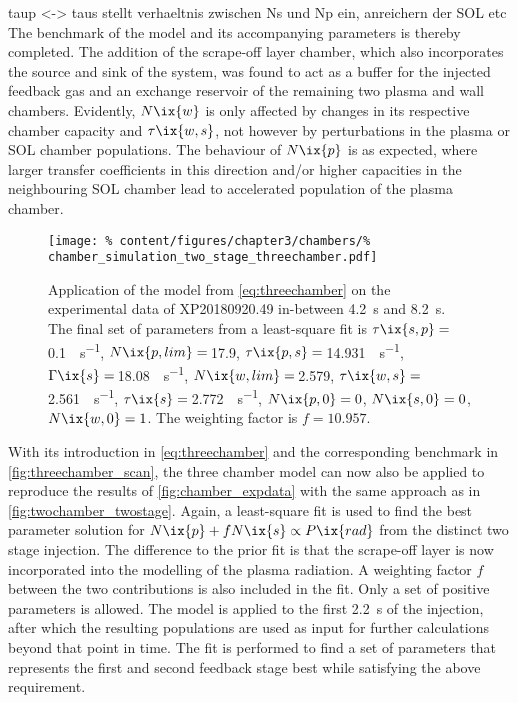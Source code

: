 %
            taup <-> taus stellt verhaeltnis zwischen Ns und Np ein, anreichern der SOL etc
            The benchmark of the model and its accompanying parameters is thereby completed. The addition of the scrape-off layer chamber, which also incorporates the source and sink of the system, was found to act as a buffer for the injected feedback gas and an exchange reservoir of the remaining two plasma and wall chambers. Evidently, $N\ix{w}$ is only affected by changes in its respective chamber capacity and $\tau\ix{w,s}$, not however by perturbations in the plasma or SOL chamber populations. The behaviour of $N\ix{p}$ is as expected, where larger transfer coefficients in this direction and/or higher capacities in the neighbouring SOL chamber lead to accelerated population of the plasma chamber.\\%
%
            \begin{figure}[t]%
                \centering%
                \texttt{[image: \%
                    content/figures/chapter3/chambers/\%
                    chamber\_simulation\_two\_stage\_threechamber.pdf]}%
                \caption{Application of the model from \cref{eq:threechamber} on the experimental data of XP20180920.49 in-between \SI{4.2}{\second} and \SI{8.2}{\second}. The final set of parameters from a least-square fit is $\tau\ix{s,p}=$\,\SI{0.1}{\arbitraryunit\per\second}, $N\ix{p,lim}=$\,\SI{17.9}{\arbitraryunit}, $\tau\ix{p,s}=$\,\SI{14.931}{\arbitraryunit\per\second}, $\Gamma\ix{s}=$\,\SI{18.08}{\arbitraryunit\per\second},  $N\ix{w,lim}=$\,\SI{2.579}{\arbitraryunit}, $\tau\ix{w,s}=$\,\SI{2.561}{\arbitraryunit\per\second}, $\tau\ix{s}=$\,\SI{2.772}{\arbitraryunit\per\second}, $N\ix{p,0}=0$, $N\ix{s,0}=0$, $N\ix{w,0}=1$. The weighting factor is $f=10.957$.}\label{fig:threechamber_twostage}%
            \end{figure}%
%
            With its introduction in \cref{eq:threechamber} and the corresponding benchmark in \cref{fig:threechamber_scan}, the three chamber model can now also be applied to reproduce the results of \cref{fig:chamber_expdata} with the same approach as in \cref{fig:twochamber_twostage}. Again, a least-square fit is used to find the best parameter solution for $N\ix{p}+fN\ix{s}\propto P\ix{rad}$ from the distinct two stage injection. The difference to the prior fit is that the scrape-off layer is now incorporated into the modelling of the plasma radiation. A weighting factor $f$ between the two contributions is also included in the fit. Only a set of positive parameters is allowed. The model is applied to the first \SI{2.2}{\second} of the injection, after which the resulting populations are used as input for further calculations beyond that point in time. The fit is performed to find a set of parameters that represents the first and second feedback stage best while satisfying the above requirement.\\%
